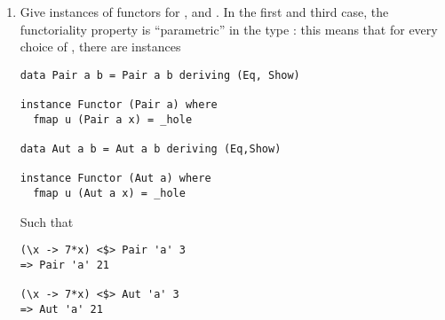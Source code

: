\documentclass[11pt]{article}
\begin{document}
\footnotesize
\begin{enumerate}
	\item Give instances of functors for ,  and . In the first and third case, the functoriality property is ``parametric'' in the type : this means that for every choice of , there are instances 
	\begin{verbatim}
data Pair a b = Pair a b deriving (Eq, Show)

instance Functor (Pair a) where
  fmap u (Pair a x) = _hole

data Aut a b = Aut a b deriving (Eq,Show)

instance Functor (Aut a) where
  fmap u (Aut a x) = _hole
	\end{verbatim}
	Such that
	\begin{verbatim}
(\x -> 7*x) <$> Pair 'a' 3
=> Pair 'a' 21

(\x -> 7*x) <$> Aut 'a' 3
=> Aut 'a' 21
	\end{verbatim}


\end{enumerate}
\end{document}
